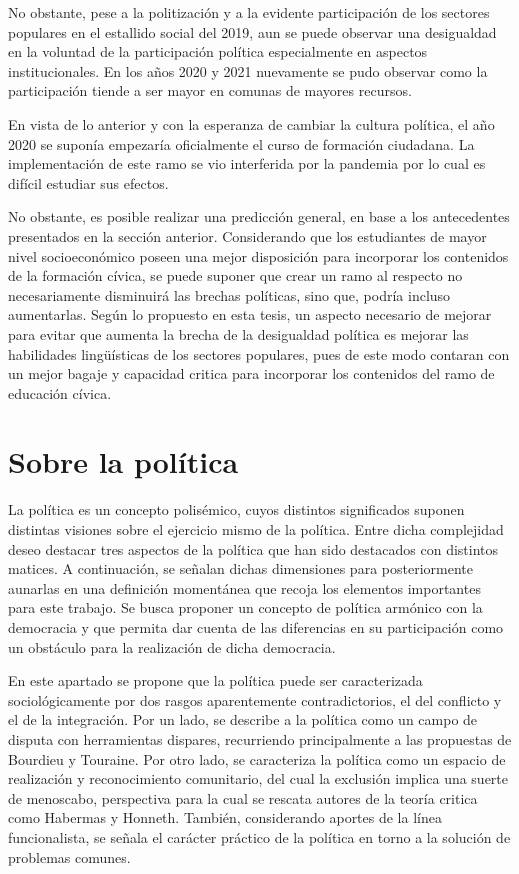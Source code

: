 \documentclass[12pt,twoside]{templates/facsothesis}
\begin{document}
No obstante, pese a la politización y a la evidente participación de los sectores populares en el estallido social del 2019, aun se puede observar una desigualdad en la voluntad de la participación política especialmente en aspectos institucionales. En los años 2020 y 2021 nuevamente se pudo observar como la participación tiende a ser mayor en comunas de mayores recursos.

En vista de lo anterior y con la esperanza de cambiar la cultura política, el año 2020 se suponía empezaría oficialmente el curso de formación ciudadana. La implementación de este ramo se vio interferida por la pandemia por lo cual es difícil estudiar sus efectos.

No obstante, es posible realizar una predicción general, en base a los antecedentes presentados en la sección anterior. Considerando que los estudiantes de mayor nivel socioeconómico poseen una mejor disposición para incorporar los contenidos de la formación cívica, se puede suponer que crear un ramo al respecto no necesariamente disminuirá las brechas políticas, sino que, podría incluso aumentarlas. Según lo propuesto en esta tesis, un aspecto necesario de mejorar para evitar que aumenta la brecha de la desigualdad política es mejorar las habilidades lingüísticas de los sectores populares, pues de este modo contaran con un mejor bagaje y capacidad critica para incorporar los contenidos del ramo de educación cívica.

\hypertarget{sobre-la-poluxedtica}{%
\section{Sobre la política}\label{sobre-la-poluxedtica}}

La política es un concepto polisémico, cuyos distintos significados suponen distintas visiones sobre el ejercicio mismo de la política. Entre dicha complejidad deseo destacar tres aspectos de la política que han sido destacados con distintos matices. A continuación, se señalan dichas dimensiones para posteriormente aunarlas en una definición momentánea que recoja los elementos importantes para este trabajo. Se busca proponer un concepto de política armónico con la democracia y que permita dar cuenta de las diferencias en su participación como un obstáculo para la realización de dicha democracia.

En este apartado se propone que la política puede ser caracterizada sociológicamente por dos rasgos aparentemente contradictorios, el del conflicto y el de la integración. Por un lado, se describe a la política como un campo de disputa con herramientas dispares, recurriendo principalmente a las propuestas de Bourdieu y Touraine. Por otro lado, se caracteriza la política como un espacio de realización y reconocimiento comunitario, del cual la exclusión implica una suerte de menoscabo, perspectiva para la cual se rescata autores de la teoría critica como Habermas y Honneth. También, considerando aportes de la línea funcionalista, se señala el carácter práctico de la política en torno a la solución de problemas comunes.
\end{document}
